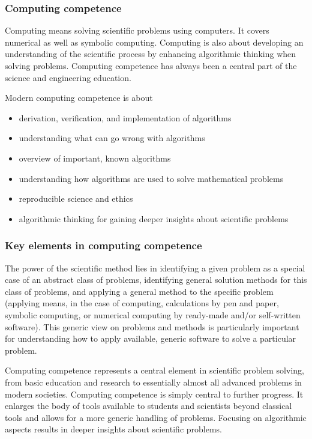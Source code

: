 \documentclass{beamer}
\begin{document}
\begin{frame}
\frametitle{Computing competence}

\begin{block}{}
Computing means solving scientific problems using computers. It covers
numerical as well as symbolic computing. Computing is also about
developing an understanding of the scientific process by enhancing
algorithmic thinking when solving problems.  Computing competence has
always been a central part of the science and engineering
education.

Modern computing competence is about

\begin{itemize}
\item derivation, verification, and implementation of algorithms

\item understanding what can go wrong with algorithms

\item overview of important, known algorithms

\item understanding how algorithms are used to solve mathematical problems

\item reproducible science and ethics

\item algorithmic thinking for gaining deeper insights about scientific problems
\end{itemize}

\noindent
\end{block}
\end{frame}

\begin{frame}
\frametitle{Key elements in computing competence}

\begin{block}{}
The power of the scientific method lies in identifying a given problem
as a special case of an abstract class of problems, identifying
general solution methods for this class of problems, and applying a
general method to the specific problem (applying means, in the case of
computing, calculations by pen and paper, symbolic computing, or
numerical computing by ready-made and/or self-written software). This
generic view on problems and methods is particularly important for
understanding how to apply available, generic software to solve a
particular problem.


Computing competence represents a central element
in scientific problem solving, from basic education and research to
essentially almost all advanced problems in modern
societies. Computing competence is simply central to further
progress. It enlarges the body of tools available to students and
scientists beyond classical tools and allows for a more generic
handling of problems. Focusing on algorithmic aspects results in
deeper insights about scientific problems.


\end{block}
\end{frame}
\end{document}
